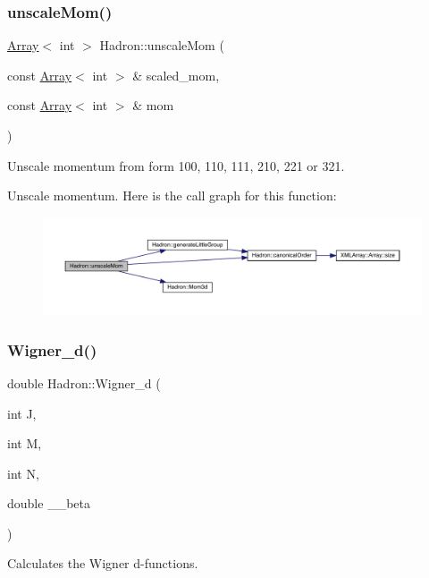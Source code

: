 \subsubsection{\texorpdfstring{unscaleMom()}{unscaleMom()}}
{\footnotesize\ttfamily \mbox{\hyperlink{classXMLArray_1_1Array}{Array}}$<$ int $>$ Hadron\+::unscale\+Mom (\begin{DoxyParamCaption}\item[{const \mbox{\hyperlink{classXMLArray_1_1Array}{Array}}$<$ int $>$ \&}]{scaled\+\_\+mom,  }\item[{const \mbox{\hyperlink{classXMLArray_1_1Array}{Array}}$<$ int $>$ \&}]{mom }\end{DoxyParamCaption})}



Unscale momentum from form 100, 110, 111, 210, 221 or 321. 

Unscale momentum. Here is the call graph for this function\+:
\nopagebreak
\begin{figure}[H]
\begin{center}
\leavevmode
\includegraphics[width=350pt]{d1/daf/namespaceHadron_ad5e2b22f66d2effe70db7f0ba129eae1_cgraph}
\end{center}
\end{figure}
\mbox{\label{namespaceHadron_a63c49af65c1d943a78205d3b8b63079a}} 
\subsubsection{\texorpdfstring{Wigner\_d()}{Wigner\_d()}}
{\footnotesize\ttfamily double Hadron\+::\+Wigner\+\_\+d (\begin{DoxyParamCaption}\item[{int}]{J,  }\item[{int}]{M,  }\item[{int}]{N,  }\item[{double}]{\+\_\+\+\_\+beta }\end{DoxyParamCaption})}

Calculates the Wigner d-\/functions.

